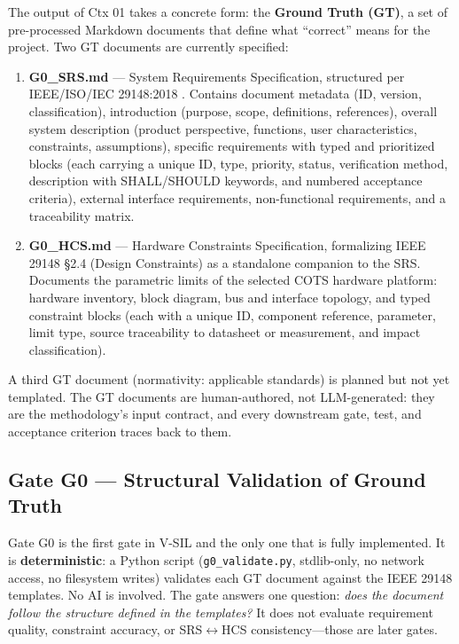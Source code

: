 \documentclass[11pt,a4paper]{article}
\begin{document}
The output of Ctx 01 takes a concrete form: the \textbf{Ground Truth (GT)}, a set of
pre-processed Markdown documents that define what ``correct'' means for the project. Two GT
documents are currently specified:

\begin{enumerate}
  \item \textbf{G0\_SRS.md} --- System Requirements Specification, structured per
    IEEE/ISO/IEC 29148:2018 \cite{ieee29148}. Contains document metadata (ID, version,
    classification), introduction (purpose, scope, definitions, references), overall system
    description (product perspective, functions, user characteristics, constraints, assumptions),
    specific requirements with typed and prioritized blocks (each carrying a unique ID, type,
    priority, status, verification method, description with SHALL/SHOULD keywords, and numbered
    acceptance criteria), external interface requirements, non-functional requirements, and a
    traceability matrix.
  \item \textbf{G0\_HCS.md} --- Hardware Constraints Specification, formalizing IEEE 29148
    \S2.4 (Design Constraints) as a standalone companion to the SRS. Documents the parametric
    limits of the selected COTS hardware platform: hardware inventory, block diagram, bus and
    interface topology, and typed constraint blocks (each with a unique ID, component reference,
    parameter, limit type, source traceability to datasheet or measurement, and impact
    classification).
\end{enumerate}

A third GT document (normativity: applicable standards) is planned but not yet templated.
The GT documents are human-authored, not LLM-generated: they are the methodology's input
contract, and every downstream gate, test, and acceptance criterion traces back to them.

\subsection{Gate G0 --- Structural Validation of Ground Truth}
\label{sec:g0}

Gate G0 is the first gate in V-SIL and the only one that is fully implemented. It is
\textbf{deterministic}: a Python script (\texttt{g0\_validate.py}, stdlib-only, no network
access, no filesystem writes) validates each GT document against the IEEE 29148 templates.
No AI is involved. The gate answers one question: \emph{does the document follow the
structure defined in the templates?} It does not evaluate requirement quality, constraint
accuracy, or SRS$\leftrightarrow$HCS consistency---those are later gates.
\end{document}

